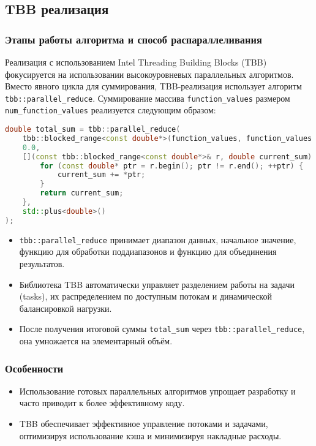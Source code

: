 \documentclass[12pt]{article}
\begin{document}
\subsection{TBB реализация}
\subsubsection*{Этапы работы алгоритма и способ распараллеливания}
Реализация с использованием Intel Threading Building Blocks (TBB) фокусируется на использовании высокоуровневых параллельных алгоритмов. Вместо явного цикла для суммирования, TBB-реализация использует алгоритм \texttt{tbb::parallel\_reduce}. Суммирование массива \texttt{function\_values} размером \texttt{num\_function\_values} реализуется следующим образом:
\begin{lstlisting}[language=C++, basicstyle=\small\ttfamily, frame=none, numbers=none]
double total_sum = tbb::parallel_reduce(
    tbb::blocked_range<const double*>(function_values, function_values + num_function_values),
    0.0,
    [](const tbb::blocked_range<const double*>& r, double current_sum) -> double {
        for (const double* ptr = r.begin(); ptr != r.end(); ++ptr) {
            current_sum += *ptr;
        }
        return current_sum;
    },
    std::plus<double>()
);
\end{lstlisting}
\begin{itemize}
    \item \texttt{tbb::parallel\_reduce} принимает диапазон данных, начальное значение, функцию для обработки поддиапазонов и функцию для объединения результатов.
    \item Библиотека TBB автоматически управляет разделением работы на задачи (tasks), их распределением по доступным потокам и динамической балансировкой нагрузки.
    \item После получения итоговой суммы \texttt{total\_sum} через \texttt{tbb::parallel\_reduce}, она умножается на элементарный объём.
\end{itemize}

\subsubsection*{Особенности}
\begin{itemize}
  \item Использование готовых параллельных алгоритмов упрощает разработку и часто приводит к более эффективному коду.
  \item TBB обеспечивает эффективное управление потоками и задачами, оптимизируя использование кэша и минимизируя накладные расходы.
\end{itemize}
\end{document}
